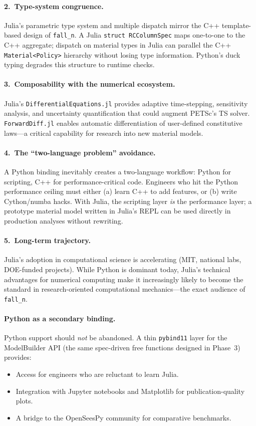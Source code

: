 \paragraph{2.\ Type-system congruence.}
Julia's parametric type system and multiple dispatch mirror the
C++ template-based design of \texttt{fall\_n}.  A Julia
\texttt{struct RCColumnSpec} maps one-to-one to the C++ aggregate;
dispatch on material types in Julia can parallel the C++
\texttt{Material<Policy>} hierarchy without losing type information.
Python's duck typing degrades this structure to runtime checks.

\paragraph{3.\ Composability with the numerical ecosystem.}
Julia's \texttt{DifferentialEquations.jl} provides adaptive
time-stepping, sensitivity analysis, and uncertainty quantification
that could augment PETSc's TS solver.
\texttt{ForwardDiff.jl} enables automatic differentiation of
user-defined constitutive laws---a critical capability for
research into new material models.

\paragraph{4.\ The ``two-language problem'' avoidance.}
A Python binding inevitably creates a two-language workflow:
Python for scripting, C++ for performance-critical code.
Engineers who hit the Python performance ceiling must either
(a) learn C++ to add features, or (b) write Cython/numba hacks.
With Julia, the scripting layer \emph{is} the performance layer;
a prototype material model written in Julia's REPL can be
used directly in production analyses without rewriting.

\paragraph{5.\ Long-term trajectory.}
Julia's adoption in computational science is accelerating
(MIT, national labs, DOE-funded projects).  While Python is
dominant today, Julia's technical advantages for numerical
computing make it increasingly likely to become the standard
in research-oriented computational mechanics---the exact
audience of \texttt{fall\_n}.

\paragraph{Python as a secondary binding.}
Python support should \emph{not} be abandoned.  A thin
\texttt{pybind11} layer for the ModelBuilder API (the same
spec-driven free functions designed in Phase~3) provides:
\begin{itemize}
  \item Access for engineers who are reluctant to learn Julia.
  \item Integration with Jupyter notebooks and Matplotlib for
        publication-quality plots.
  \item A bridge to the OpenSeesPy community for comparative
        benchmarks.
\end{itemize}

